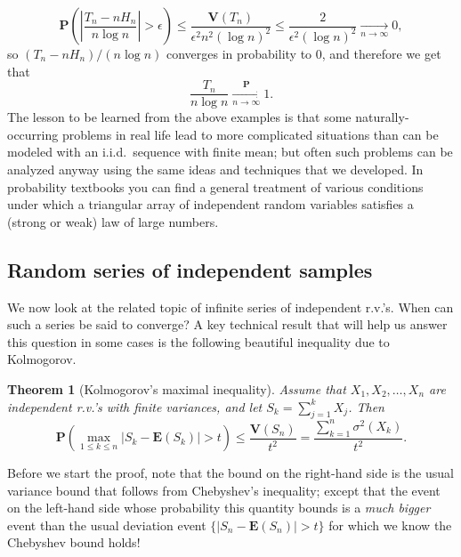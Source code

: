 \documentclass[12pt]{article}
\newtheorem{thm}{Theorem}[section]
\newcommand{\prob}{\mathbf{P}}
\newcommand{\expec}{\mathbf{E}}
\newcommand{\var}{\mathbf{V}}
\theoremstyle{example}
\begin{document}
$$
\prob\left( \left|\frac{T_n-n H_n}{n \log n} \right| > \epsilon\right) \le \frac{\var(T_n)}{\epsilon^2 n^2 (\log n)^2}
\le \frac{2}{\epsilon^2 (\log n)^2} \xrightarrow[n\to\infty]{} 0,
$$
so $(T_n-n H_n)/(n\log n)$ converges in probability to $0$, and therefore we get that
$$ \frac{T_n}{n\log n} \xrightarrow[n\to\infty]{\prob} 1. $$
The lesson to be learned from the above examples is that some naturally-occurring problems in real life lead to more complicated situations than can be modeled with an i.i.d.\ sequence with finite mean; but often such problems can be analyzed anyway using the same ideas and techniques that we developed. In probability textbooks you can find a general treatment of various conditions under which a triangular array of independent random variables satisfies a (strong or weak) law of large numbers.

\subsection{Random series of independent samples}

We now look at the related topic of infinite series of independent r.v.'s. When can such a series be said to converge? A key technical result that will help us answer this question in some cases is the following beautiful inequality due to Kolmogorov.

\begin{thm}[Kolmogorov's maximal inequality] Assume that $X_1,X_2,\ldots,X_n$ are independent r.v.'s with finite variances, and let $S_k=\sum_{j=1}^k X_j$. Then
$$ \prob\left( \max_{1\le k\le n} |S_k-\expec (S_k)| > t \right) \le \frac{\var(S_n)}{t^2} = \frac{\sum_{k=1}^n \sigma^2(X_k)}{t^2}. $$
\end{thm}

Before we start the proof, note that the bound on the right-hand side is the usual variance bound that follows from Chebyshev's inequality; except that the event on the left-hand side whose probability this quantity bounds is a \emph{much bigger} event than the usual deviation event $\{ |S_n-\expec(S_n)|>t\}$ for which we know the Chebyshev bound holds!
\end{document}

